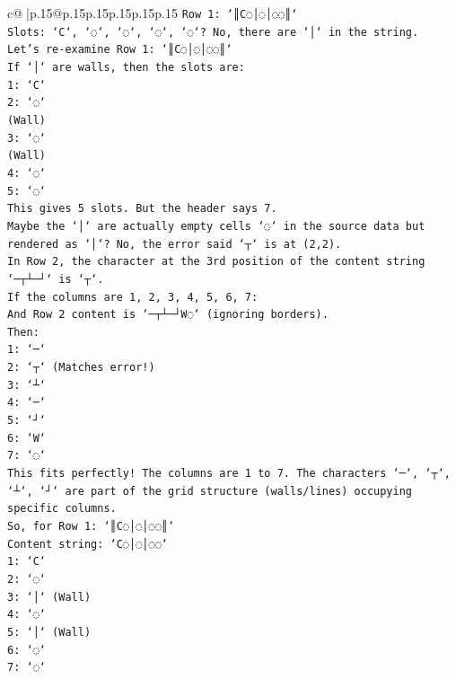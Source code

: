 \documentclass{article}
\begin{document}
{\begin{supertabular}{c@{$\;$}|p{.15\linewidth}@{}p{.15\linewidth}p{.15\linewidth}p{.15\linewidth}p{.15\linewidth}p{.15\linewidth}}
{{{\texttt{Row 1: `║C◌│◌│◌◌║`} \\
\texttt{Slots: `C`, `◌`, `◌`, `◌`, `◌`? No, there are `│` in the string.} \\
\texttt{Let's re{-}examine Row 1: `║C◌│◌│◌◌║`} \\
\texttt{If `│` are walls, then the slots are:} \\
\texttt{1: `C`} \\
\texttt{2: `◌`} \\
\texttt{(Wall)} \\
\texttt{3: `◌`} \\
\texttt{(Wall)} \\
\texttt{4: `◌`} \\
\texttt{5: `◌`} \\
\texttt{This gives 5 slots. But the header says 7.} \\
\texttt{Maybe the `│` are actually empty cells `◌` in the source data but rendered as `│`? No, the error said `┬` is at (2,2).} \\
\texttt{In Row 2, the character at the 3rd position of the content string `─┬┴─┘` is `┬`.} \\
\texttt{If the columns are 1, 2, 3, 4, 5, 6, 7:} \\
\texttt{And Row 2 content is `─┬┴─┘W◌` (ignoring borders).} \\
\texttt{Then:} \\
\texttt{1: `─`} \\
\texttt{2: `┬` (Matches error!)} \\
\texttt{3: `┴`} \\
\texttt{4: `─`} \\
\texttt{5: `┘`} \\
\texttt{6: `W`} \\
\texttt{7: `◌`} \\
\texttt{This fits perfectly! The columns are 1 to 7. The characters `─`, `┬`, `┴`, `┘` are part of the grid structure (walls/lines) occupying specific columns.} \\
\texttt{So, for Row 1: `║C◌│◌│◌◌║`} \\
\texttt{Content string: `C◌│◌│◌◌`} \\
\texttt{1: `C`} \\
\texttt{2: `◌`} \\
\texttt{3: `│` (Wall)} \\
\texttt{4: `◌`} \\
\texttt{5: `│` (Wall)} \\
\texttt{6: `◌`} \\
\texttt{7: `◌`} \\
}}}
\end{supertabular}}
\end{document}
